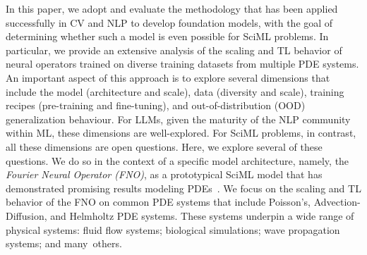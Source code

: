 In this paper, we adopt and evaluate the methodology that has been applied successfully in CV and NLP to develop foundation models, with the goal of determining whether such a model is even possible for SciML problems.
In particular, we provide an extensive analysis of the scaling and TL behavior of neural operators trained on diverse training datasets from multiple PDE systems.
An important aspect of this approach is to explore several dimensions that include the model (architecture and scale), data (diversity and scale), training recipes (pre-training and fine-tuning), and out-of-distribution (OOD) generalization behaviour. 
For LLMs, given the maturity of the NLP community within ML, these dimensions are well-explored.
For SciML problems, in contrast, all these dimensions are open questions. 
Here, we explore several of these questions.
We do so in the context of a specific model architecture, namely, the \emph{Fourier Neural Operator (FNO)}, as a prototypical SciML model that has demonstrated promising results modeling PDEs~\cite{li2020fourier}.
We focus on the scaling and TL behavior of the FNO on common PDE systems that include Poisson's, Advection-Diffusion, and Helmholtz PDE systems.
These systems underpin a wide range of physical systems: fluid flow systems; biological simulations; wave propagation systems; and many~others. 

